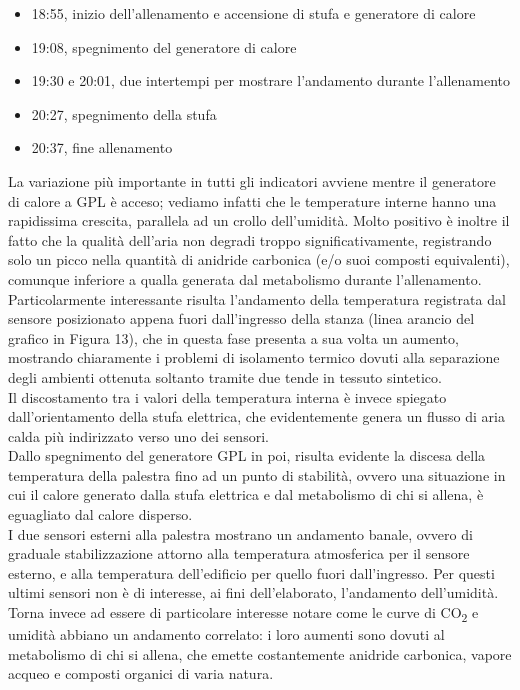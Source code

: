 \documentclass[fleqn,10pt]{SelfArx} %
\begin{document}
\begin{itemize}[noitemsep] %
	\item 18:55, inizio dell'allenamento e accensione di stufa e generatore di calore
	\item 19:08, spegnimento del generatore di calore 
	\item 19:30 e 20:01, due intertempi per mostrare l'andamento durante l'allenamento
	\item 20:27, spegnimento della stufa
	\item 20:37, fine allenamento
\end{itemize}

La variazione più importante in tutti gli indicatori avviene mentre il generatore di calore a GPL è 
acceso; vediamo infatti che le temperature interne hanno una rapidissima crescita, parallela ad un 
crollo dell'umidità. Molto positivo è inoltre il fatto che la qualità dell'aria non degradi troppo 
significativamente, registrando solo un picco nella quantità di anidride carbonica (e/o suoi composti 
equivalenti), comunque inferiore a qualla generata dal metabolismo durante l'allenamento.\\
Particolarmente interessante risulta l'andamento della temperatura registrata dal sensore posizionato 
appena fuori dall'ingresso della stanza (linea arancio del grafico in Figura 13), che in questa fase 
presenta a sua volta un aumento, mostrando chiaramente i problemi di isolamento
termico dovuti alla separazione degli ambienti ottenuta soltanto tramite due tende in tessuto sintetico.\\
Il discostamento tra i valori della temperatura interna è invece spiegato dall'orientamento della stufa 
elettrica, che evidentemente genera un flusso di aria calda più indirizzato verso uno dei sensori.\\

Dallo spegnimento del generatore GPL in poi, risulta evidente la discesa della temperatura della 
palestra fino ad un punto di stabilità, ovvero una situazione in cui il calore generato dalla stufa 
elettrica e dal metabolismo di chi si allena, è eguagliato dal calore disperso.\\
I due sensori esterni alla palestra mostrano un andamento banale, ovvero di graduale stabilizzazione 
attorno alla temperatura atmosferica per il sensore esterno, e alla temperatura dell'edificio per quello 
fuori dall'ingresso. Per questi ultimi sensori non è di interesse, ai fini dell'elaborato, l'andamento 
dell'umidità.
\\
Torna invece ad essere di particolare interesse notare come le curve di CO\textsubscript{2} e 
umidità abbiano un andamento correlato: i loro aumenti sono dovuti al metabolismo di chi si allena, 
che emette costantemente anidride carbonica, vapore acqueo e composti organici di varia natura.\\
\end{document}
